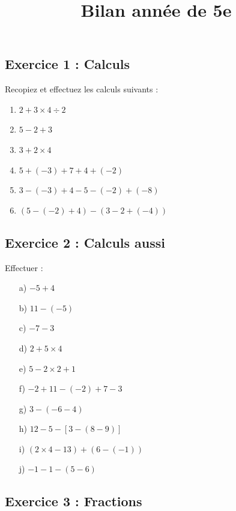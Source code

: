 \documentclass[14pt]{extreport}
\title{Bilan année de 5e}
\date{}
\theoremstyle{plain}
\begin{document}
\subsection*{Exercice 1 : Calculs}  %
Recopiez et effectuez les calculs suivants : 

\begin{enumerate}
\item $2+3\times4\div2$
\item $5 - 2 + 3$
\item $ 3+2\times 4$
\item $ 5 + (-3) + 7 +  4 +  (-2) $
\item $ 3 - (-3) + 4 - 5 - (-2) + (-8)$
\item $(5-(-2) + 4) - (3- 2 + (-4))$
\end{enumerate}

\subsection*{Exercice 2 : Calculs aussi}

Effectuer : 
\begin{enumerate}
\item[a)] $ -5 + 4$
\item[b)] $ 11 - (- 5)$
\item[c)] $ - 7 - 3$
\item[d)] $ 2 + 5\times 4$
\item[e)] $ 5- 2 \times 2 +1$

\item[f)] $ -2 + 11 - (-2) + 7 - 3$
\item[g)] $ 3  - (-6 - 4)$
\item[h)] $ 12 - 5 - [3 - (8-9)] $
\item[i)] $ 	(2 \times 4- 13) + (6-  (-1))$
\item[j)] $ - 1 - 1 - (5 - 6)$
\end{enumerate}

\subsection*{Exercice 3 : Fractions}
\end{document}
